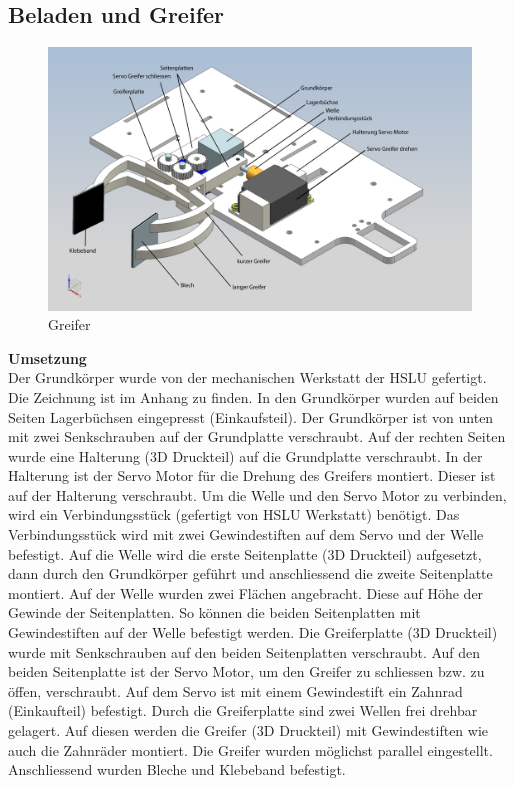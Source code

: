 \newpage
\subsection{Beladen und Greifer}
\begin{figure}[H]
\centering
\includegraphics[width=1\textwidth]{03_Loesungskonzept/pictures/Greifer2.png}
\caption{Greifer}
\end{figure}
\textbf{Umsetzung}\\[0.2cm]
Der Grundkörper wurde von der mechanischen Werkstatt der HSLU gefertigt. Die Zeichnung ist im Anhang zu finden. In den Grundkörper wurden auf beiden Seiten Lagerbüchsen eingepresst (Einkaufsteil). Der Grundkörper ist von unten mit zwei Senkschrauben auf der Grundplatte verschraubt.
Auf der rechten Seiten wurde eine Halterung (3D Druckteil) auf die Grundplatte verschraubt. In der Halterung ist der Servo Motor für die Drehung des Greifers montiert. Dieser ist auf der Halterung verschraubt. Um die Welle und den Servo Motor zu verbinden, wird ein Verbindungsstück (gefertigt von HSLU Werkstatt) benötigt. Das Verbindungsstück wird mit zwei Gewindestiften auf dem Servo und der Welle befestigt. Auf die Welle wird die erste Seitenplatte (3D Druckteil) aufgesetzt, dann durch den Grundkörper geführt und anschliessend die zweite Seitenplatte montiert. Auf der Welle wurden zwei Flächen angebracht. Diese auf Höhe der Gewinde der Seitenplatten. So können die beiden Seitenplatten mit Gewindestiften auf der Welle befestigt werden. Die Greiferplatte (3D Druckteil) wurde mit Senkschrauben auf den beiden Seitenplatten verschraubt. 
Auf den beiden Seitenplatte ist der Servo Motor, um den Greifer zu schliessen bzw. zu öffen, verschraubt. Auf dem Servo ist mit einem Gewindestift ein Zahnrad (Einkaufteil) befestigt. Durch die Greiferplatte sind zwei Wellen frei drehbar gelagert. Auf diesen werden die Greifer (3D Druckteil) mit Gewindestiften wie auch die Zahnräder montiert. Die Greifer wurden möglichst parallel eingestellt. Anschliessend wurden Bleche und Klebeband befestigt.
